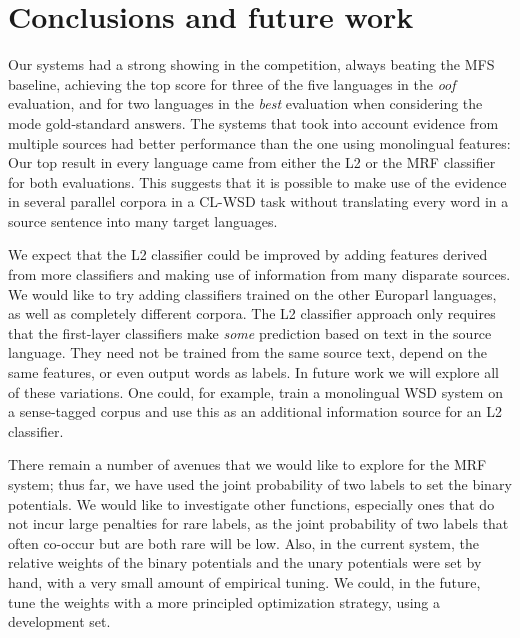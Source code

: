 \documentclass[11pt,letterpaper]{article}
\begin{document}
\section{Conclusions and future work}
Our systems had a strong showing in the competition, always beating the MFS
baseline, achieving the top score for three of the five languages in the
\emph{oof} evaluation, and for two languages in the \emph{best} evaluation when
considering the mode gold-standard answers. The systems that took into account
evidence from multiple sources had better performance than the one using
monolingual features: Our top result in every language came from either the L2
or the MRF classifier for both evaluations. This suggests that it is possible
to make use of the evidence in several parallel corpora in a CL-WSD task
without translating every word in a source sentence into many target languages.

We expect that the L2 classifier could be improved by adding features derived
from more classifiers and making use of information from many disparate
sources. We would like to try adding classifiers trained on the other Europarl
languages, as well as completely different corpora. The L2 classifier approach
only requires that the first-layer classifiers make \emph{some} prediction
based on text in the source language.  They need not be trained from the same
source text, depend on the same features, or even output words as labels. In
future work we will explore all of these variations. One could, for example,
train a monolingual WSD system on a sense-tagged corpus and use this as an
additional information source for an L2 classifier.


There remain a number of avenues that we would like to explore for the MRF
system; thus far, we have used the joint probability of two labels to set the
binary potentials. We would like to investigate other functions, especially
ones that do not incur large penalties for rare labels, as the joint
probability of two labels that often co-occur but are both rare will be low.
Also, in the current system, the relative weights of the binary potentials and
the unary potentials were set by hand, with a very small amount of empirical
tuning. We could, in the future, tune the weights with a more principled
optimization strategy, using a development set.
\end{document}
